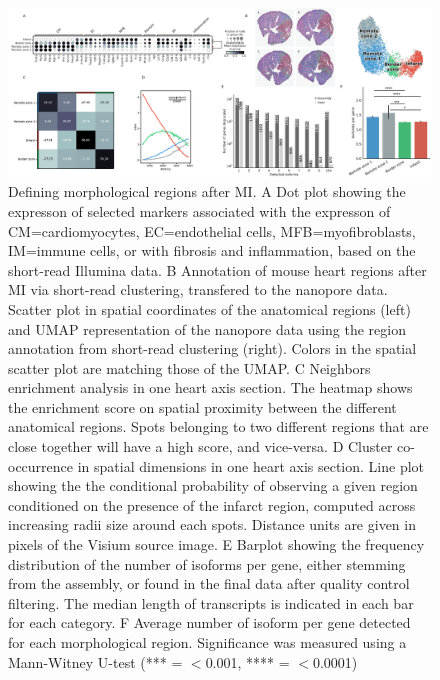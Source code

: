 \documentclass[utf8]{FrontiersinHarvard} %
\begin{document}
\begin{figure}[h!]
\begin{center}
\includegraphics[width=\textwidth]{figure2}
\end{center}
\caption{Defining morphological regions after MI. A Dot plot showing the expresson of selected markers associated with the expresson of CM=cardiomyocytes, EC=endothelial cells, MFB=myofibroblasts, IM=immune cells, or with fibrosis and inflammation, based on the short-read Illumina data. B Annotation of mouse heart regions after MI via short-read clustering, transfered to the nanopore data. Scatter plot in spatial coordinates of the anatomical regions (left) and UMAP representation of the nanopore data using the region annotation from short-read clustering (right). Colors in the spatial scatter plot are matching those of the UMAP. C Neighbors enrichment analysis in one heart axis section. The heatmap shows the enrichment score on spatial proximity between the different anatomical regions. Spots belonging to two different regions that are close together will have a high score, and vice-versa. D Cluster co-occurrence in spatial dimensions in one heart axis section. Line plot showing the the conditional probability of observing a given region conditioned on the presence of the infarct region, computed across increasing radii size around each spots. Distance units are given in pixels of the Visium source image. E Barplot showing the frequency distribution of the number of isoforms per gene, either stemming from the assembly, or found in the final data after quality control filtering. The median length of transcripts is indicated in each bar for each category. F Average number of isoform per gene detected for each morphological region. Significance was measured using a Mann-Witney U-test (*** = $<$0.001, **** = $<$0.0001)}\label{fig:2}
\end{figure}
\end{document}
